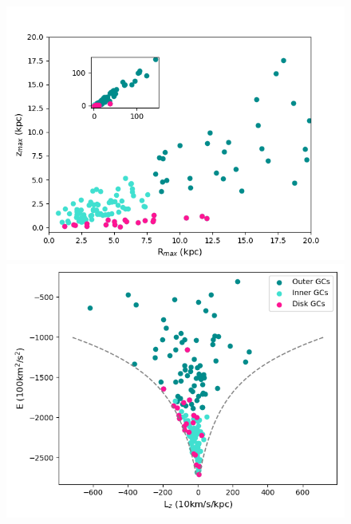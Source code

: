 \begin{figure}
\begin{center}
                \includegraphics[clip=true, trim = 0mm 0mm 0mm 0mm, width=0.7\columnwidth]{images/PII_orbitparams_Rzmax.png}
                \includegraphics[clip=true, trim = 0mm 0mm 0mm 0mm, width=0.7\columnwidth]{images/PII_orbitparams_ELz_class.png}

\end{center}
\end{figure}
